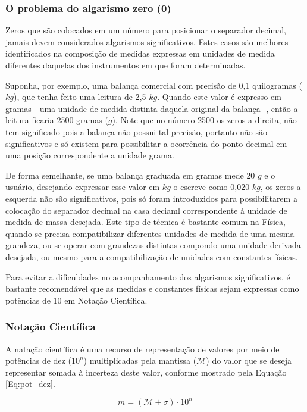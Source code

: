 \documentclass[a4paper, 11pt]{report}
\begin{document}
\subsubsection{O problema do algarismo zero (0)}
Zeros que são colocados em um número para posicionar o separador decimal, jamais
devem considerados algarismos significativos. Estes casos são melhores 
identificados na composição de medidas expressas em unidades de medida 
diferentes daquelas dos instrumentos em que foram determinadas.

Suponha, por exemplo, uma balança comercial com precisão de 0,1 quilogramas 
($kg$), que tenha feito uma leitura de 2,5 $kg$. Quando este valor é expresso em
gramas - uma unidade de medida distinta daquela original da balança -, então a 
leitura ficaria 2500 gramas ($g$). Note que no número 2500 os zeros a direita, 
não tem significado pois a balança não possui tal precisão, portanto não são 
significativos e só existem para possibilitar a ocorrência do ponto decimal 
em uma posição correspondente a unidade grama.

De forma semelhante, se uma balança graduada em gramas mede 20 $g$ e o 
usuário, desejando expressar esse valor em $kg$ o escreve como 0,020 $kg$, os 
zeros a esquerda não são significativos, pois só foram introduzidos para 
possibilitarem a colocação do separador decimal na casa deciaml correspondente 
à unidade de medida de massa desejada. Este tipo de técnica é bastante comum na 
Física, quando se precisa compatibilizar diferentes unidades de medida de uma 
mesma grandeza, ou se operar com grandezas distintas compondo uma unidade 
derivada desejada, ou mesmo para a compatibilização de unidades com constantes 
físicas. 

Para evitar a dificuldades no acompanhamento dos algarismos significativos, é 
bastante recomendável que as medidas e constantes físicas sejam expressas como 
potências de 10 em Notação Científica. 

\subsubsection{Notação Científica}
A natação científica é uma recurso de representação de valores por meio de 
potências de dez ($10^{n}$) multiplicadas pela mantissa ($\mathcal{M}$) do valor
 que se deseja representar somada à incerteza deste valor, conforme mostrado pela 
 Equação \ref{Eq:pot_dez}.

 \begin{equation}
     m = (\mathcal{M} \pm \sigma) \cdot 10^n
     \label{Eq:pot_dez}
 \end{equation}
\end{document}
